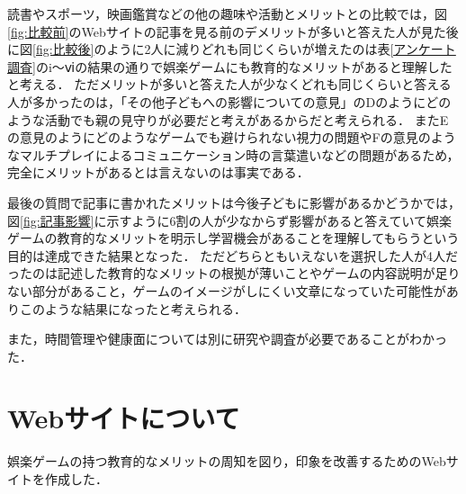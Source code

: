 \documentclass[12pt,a4j,titlepage]{ltjsarticle}
\begin{document}
読書やスポーツ，映画鑑賞などの他の趣味や活動とメリットとの比較では，図\ref{fig:比較前}のWebサイトの記事を見る前のデメリットが多いと答えた人が見た後に図\ref{fig:比較後}のように2人に減りどれも同じくらいが増えたのは表\ref{アンケート調査}のi～ⅵの結果の通りで娯楽ゲームにも教育的なメリットがあると理解したと考える．
ただメリットが多いと答えた人が少なくどれも同じくらいと答える人が多かったのは，「その他子どもへの影響についての意見」のDのようにどのような活動でも親の見守りが必要だと考えがあるからだと考えられる．
またEの意見のようにどのようなゲームでも避けられない視力の問題やFの意見のようなマルチプレイによるコミュニケーション時の言葉遣いなどの問題があるため，完全にメリットがあるとは言えないのは事実である．

最後の質問で記事に書かれたメリットは今後子どもに影響があるかどうかでは，図\ref{fig:記事影響}に示すように6割の人が少なからず影響があると答えていて娯楽ゲームの教育的なメリットを明示し学習機会があることを理解してもらうという目的は達成できた結果となった．
ただどちらともいえないを選択した人が4人だったのは記述した教育的なメリットの根拠が薄いことやゲームの内容説明が足りない部分があること，ゲームのイメージがしにくい文章になっていた可能性がありこのような結果になったと考えられる．

また，時間管理や健康面については別に研究や調査が必要であることがわかった．


\clearpage
\section{Webサイトについて}\label{Webサイトについて}
娯楽ゲームの持つ教育的なメリットの周知を図り，印象を改善するためのWebサイトを作成した．
\end{document}
